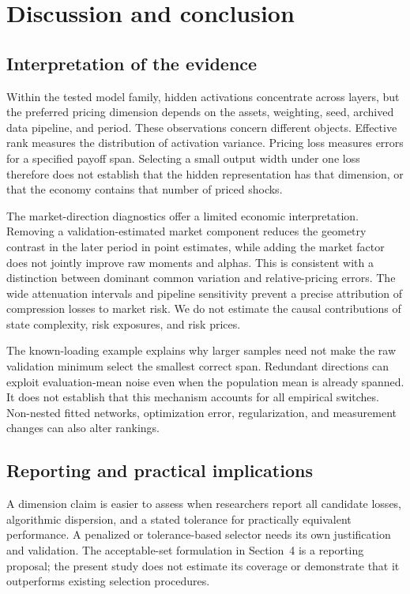 \section{Discussion and conclusion}

\subsection{Interpretation of the evidence}

Within the tested model family, hidden activations concentrate across layers, but the preferred pricing dimension depends on the assets, weighting, seed, archived data pipeline, and period. These observations concern different objects. Effective rank measures the distribution of activation variance. Pricing loss measures errors for a specified payoff span. Selecting a small output width under one loss therefore does not establish that the hidden representation has that dimension, or that the economy contains that number of priced shocks.

The market-direction diagnostics offer a limited economic interpretation. Removing a validation-estimated market component reduces the geometry contrast in the later period in point estimates, while adding the market factor does not jointly improve raw moments and alphas. This is consistent with a distinction between dominant common variation and relative-pricing errors. The wide attenuation intervals and pipeline sensitivity prevent a precise attribution of compression losses to market risk. We do not estimate the causal contributions of state complexity, risk exposures, and risk prices.

The known-loading example explains why larger samples need not make the raw validation minimum select the smallest correct span. Redundant directions can exploit evaluation-mean noise even when the population mean is already spanned. It does not establish that this mechanism accounts for all empirical switches. Non-nested fitted networks, optimization error, regularization, and measurement changes can also alter rankings.

\subsection{Reporting and practical implications}

A dimension claim is easier to assess when researchers report all candidate losses, algorithmic dispersion, and a stated tolerance for practically equivalent performance. A penalized or tolerance-based selector needs its own justification and validation. The acceptable-set formulation in Section~4 is a reporting proposal; the present study does not estimate its coverage or demonstrate that it outperforms existing selection procedures.

